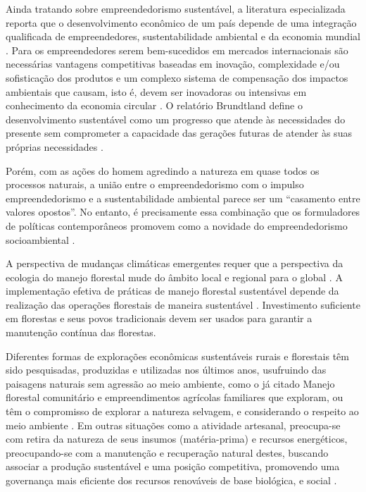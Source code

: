 Ainda tratando sobre empreendedorismo sustentável, a literatura especializada reporta que o desenvolvimento econômico de um país depende de uma integração qualificada de empreendedores, sustentabilidade ambiental e da economia mundial \cite{Swinburn2006}. Para os empreendedores serem bem-sucedidos em mercados internacionais são necessárias vantagens competitivas baseadas em inovação, complexidade e/ou sofisticação dos produtos e um complexo sistema de compensação dos impactos ambientais que causam, isto é, devem ser inovadoras ou intensivas em conhecimento da economia circular \cite{Lucas2019}. O relatório Brundtland define o desenvolvimento sustentável como um progresso que atende às necessidades do presente sem comprometer a capacidade das gerações futuras de atender às suas próprias necessidades \cite{Brundtland1987RelatorioBrundtland}.

Porém, com as ações do homem agredindo a natureza em quase todos os processos naturais, a união entre o empreendedorismo com o impulso empreendedorismo e a sustentabilidade ambiental parece ser um “casamento entre valores opostos”. No entanto, é precisamente essa combinação que os formuladores de políticas contemporâneos promovem como a novidade do empreendedorismo socioambiental \cite{Mutyasira2020,Zahra2009AChallenges}. 

A perspectiva de mudanças climáticas emergentes requer que a perspectiva da ecologia do manejo florestal mude do âmbito local e regional para o global \cite{su12145667}. A implementação efetiva de práticas de manejo florestal sustentável depende da realização das operações florestais de maneira sustentável \cite{Marchi2018SustainableClimate}. Investimento suficiente em florestas e seus povos tradicionais devem ser usados para garantir a manutenção contínua das florestas.

Diferentes formas de explorações econômicas sustentáveis rurais e florestais têm sido pesquisadas, produzidas e utilizadas nos últimos anos, usufruindo das paisagens naturais sem agressão ao meio ambiente, como o já citado  Manejo florestal comunitário e empreendimentos agrícolas familiares que exploram, ou têm o compromisso de explorar a natureza selvagem, e considerando o respeito ao meio ambiente \cite{BICHEL2021127714,doi:10.1080/00167428.2020.1798764}. Em outras situações como a atividade artesanal, preocupa-se com retira da natureza de seus insumos (matéria-prima) e recursos energéticos, preocupando-se com a manutenção e recuperação natural destes, buscando associar a produção sustentável e uma posição competitiva, promovendo uma governança mais eficiente dos recursos renováveis de base biológica, e social \cite{DAmato2020TowardsSMEs}. 

